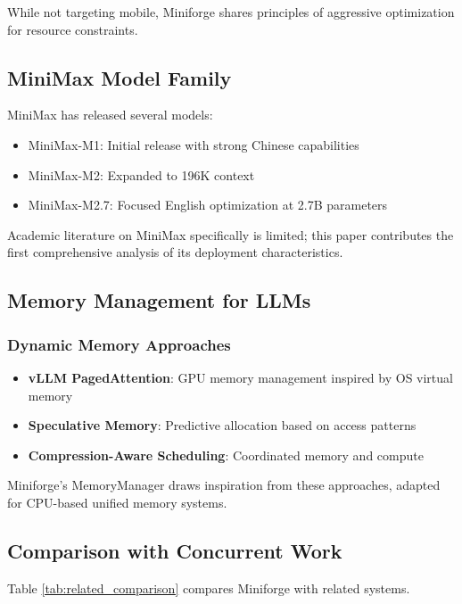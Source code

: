 While not targeting mobile, Miniforge shares principles of aggressive optimization for resource constraints.

\subsection{MiniMax Model Family}

MiniMax has released several models:

\begin{itemize}
    \item MiniMax-M1: Initial release with strong Chinese capabilities
    \item MiniMax-M2: Expanded to 196K context
    \item MiniMax-M2.7: Focused English optimization at 2.7B parameters
\end{itemize}

Academic literature on MiniMax specifically is limited; this paper contributes the first comprehensive analysis of its deployment characteristics.

\subsection{Memory Management for LLMs}

\subsubsection{Dynamic Memory Approaches}

\begin{itemize}
    \item \textbf{vLLM PagedAttention}: GPU memory management inspired by OS virtual memory
    \item \textbf{Speculative Memory}: Predictive allocation based on access patterns
    \item \textbf{Compression-Aware Scheduling}: Coordinated memory and compute
\end{itemize}

Miniforge's MemoryManager draws inspiration from these approaches, adapted for CPU-based unified memory systems.

\subsection{Comparison with Concurrent Work}

Table \ref{tab:related_comparison} compares Miniforge with related systems.

